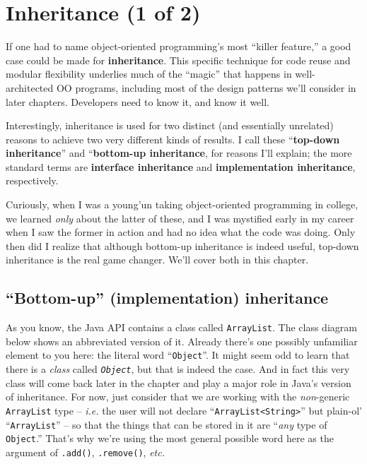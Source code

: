 
\chapter{Inheritance (1 of 2)}

If one had to name object-oriented programming's most ``killer feature,'' a
good case could be made for \textbf{inheritance}. This specific technique for
code reuse and modular flexibility underlies much of the ``magic'' that happens
in well-architected OO programs, including most of the design patterns we'll
consider in later chapters. Developers need to know it, and know it well.

Interestingly, inheritance is used for two distinct (and essentially
unrelated) reasons to achieve two very different kinds of results. I call
these ``\textbf{top-down inheritance}'' and ``\textbf{bottom-up inheritance},
for reasons I'll explain; the more standard terms are \textbf{interface
inheritance} and \textbf{implementation inheritance}, respectively.

Curiously, when I was a young'un taking object-oriented programming in
college, we learned \textit{only} about the latter of these, and I was
mystified early in my career when I saw the former in action and had no idea
what the code was doing. Only then did I realize that although bottom-up
inheritance is indeed useful, top-down inheritance is the real game changer.
We'll cover both in this chapter.

\section{``Bottom-up'' (implementation) inheritance}

As you know, the Java API contains a class called \texttt{ArrayList}. The
class diagram below shows an abbreviated version of it. Already there's one
possibly unfamiliar element to you here: the literal word ``\texttt{Object}''.
It might seem odd to learn that there is a \textit{class} called
\textit{\texttt{Object}}, but that is indeed the case. And in fact this very
class will come back later in the chapter and play a major role in Java's
version of inheritance. For now, just consider that we are working with the
\textit{non}-generic \texttt{ArrayList} type -- \textit{i.e.} the user will
not declare ``\texttt{ArrayList<String>}'' but plain-ol' ``\texttt{ArrayList}''
-- so that the things that can be stored in it are ``\textit{any} type of
\texttt{Object}.'' That's why we're using the most general possible word here
as the argument of \texttt{.add()}, \texttt{.remove()}, \textit{etc.}

